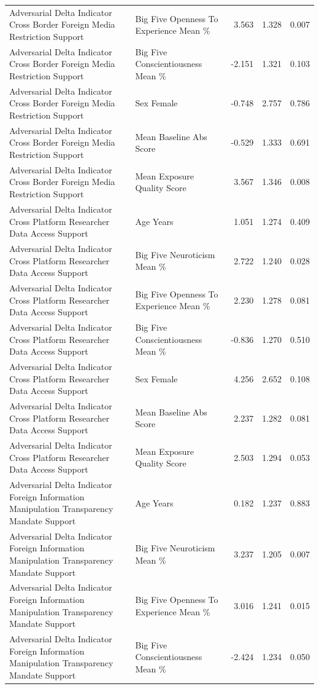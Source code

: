 \begin{table}[htbp]
\begin{threeparttable}
\begin{tabular}{llrrr}
Adversarial Delta Indicator Cross Border Foreign Media Restriction Support & Big Five Openness To Experience Mean \% & 3.563 & 1.328 & 0.007 \\
Adversarial Delta Indicator Cross Border Foreign Media Restriction Support & Big Five Conscientiousness Mean \% & -2.151 & 1.321 & 0.103 \\
Adversarial Delta Indicator Cross Border Foreign Media Restriction Support & Sex Female & -0.748 & 2.757 & 0.786 \\
Adversarial Delta Indicator Cross Border Foreign Media Restriction Support & Mean Baseline Abs Score & -0.529 & 1.333 & 0.691 \\
Adversarial Delta Indicator Cross Border Foreign Media Restriction Support & Mean Exposure Quality Score & 3.567 & 1.346 & 0.008 \\
Adversarial Delta Indicator Cross Platform Researcher Data Access Support & Age Years & 1.051 & 1.274 & 0.409 \\
Adversarial Delta Indicator Cross Platform Researcher Data Access Support & Big Five Neuroticism Mean \% & 2.722 & 1.240 & 0.028 \\
Adversarial Delta Indicator Cross Platform Researcher Data Access Support & Big Five Openness To Experience Mean \% & 2.230 & 1.278 & 0.081 \\
Adversarial Delta Indicator Cross Platform Researcher Data Access Support & Big Five Conscientiousness Mean \% & -0.836 & 1.270 & 0.510 \\
Adversarial Delta Indicator Cross Platform Researcher Data Access Support & Sex Female & 4.256 & 2.652 & 0.108 \\
Adversarial Delta Indicator Cross Platform Researcher Data Access Support & Mean Baseline Abs Score & 2.237 & 1.282 & 0.081 \\
Adversarial Delta Indicator Cross Platform Researcher Data Access Support & Mean Exposure Quality Score & 2.503 & 1.294 & 0.053 \\
Adversarial Delta Indicator Foreign Information Manipulation Transparency Mandate Support & Age Years & 0.182 & 1.237 & 0.883 \\
Adversarial Delta Indicator Foreign Information Manipulation Transparency Mandate Support & Big Five Neuroticism Mean \% & 3.237 & 1.205 & 0.007 \\
Adversarial Delta Indicator Foreign Information Manipulation Transparency Mandate Support & Big Five Openness To Experience Mean \% & 3.016 & 1.241 & 0.015 \\
Adversarial Delta Indicator Foreign Information Manipulation Transparency Mandate Support & Big Five Conscientiousness Mean \% & -2.424 & 1.234 & 0.050 \\

\end{tabular}
\end{threeparttable}
\end{table}

